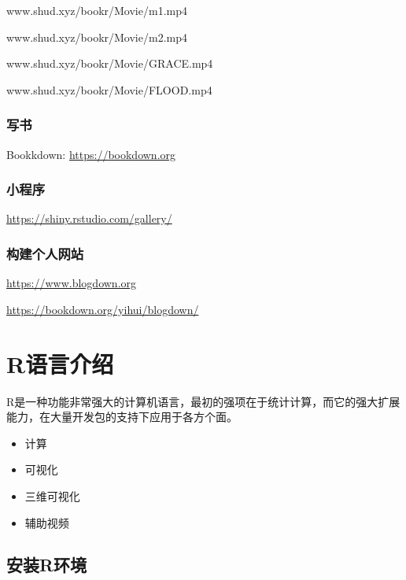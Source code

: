 \documentclass[]{scrbook}
\providecommand{\tightlist}{%
  \setlength{\itemsep}{0pt}\setlength{\parskip}{0pt}}
\begin{document}
www.shud.xyz/bookr/Movie/m1.mp4

www.shud.xyz/bookr/Movie/m2.mp4

www.shud.xyz/bookr/Movie/GRACE.mp4

www.shud.xyz/bookr/Movie/FLOOD.mp4

\hypertarget{ux5199ux4e66}{%
\subsection*{写书}\label{ux5199ux4e66}}

Bookkdown: \url{https://bookdown.org}

\hypertarget{ux5c0fux7a0bux5e8f}{%
\subsection*{小程序}\label{ux5c0fux7a0bux5e8f}}

\url{https://shiny.rstudio.com/gallery/}

\hypertarget{ux6784ux5efaux4e2aux4ebaux7f51ux7ad9}{%
\subsection*{构建个人网站}\label{ux6784ux5efaux4e2aux4ebaux7f51ux7ad9}}

\url{https://www.blogdown.org}

\url{https://bookdown.org/yihui/blogdown/}

\hypertarget{intro}{%
\chapter{R语言介绍}\label{intro}}

R是一种功能非常强大的计算机语言，最初的强项在于统计计算，而它的强大扩展能力，在大量开发包的支持下应用于各方个面。

\begin{itemize}
\tightlist
\item
  计算
\item
  可视化
\item
  三维可视化
\item
  辅助视频
\end{itemize}

\hypertarget{ux5b89ux88c5rux73afux5883}{%
\section{安装R环境}\label{ux5b89ux88c5rux73afux5883}}
\end{document}
